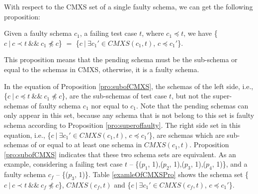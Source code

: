 With respect to the CMXS set of a single faulty schema, we can get the following proposition:


\begin{proposition}\label{pro:subofCMXS}
Given a faulty schema $c_{1}$, a failing test case $t$, where $c_{1} \preceq t$, we have \{$c\ |\ c \prec t\ \&\&\ c_{1} \npreceq c$\} $=$  \{$ c\ |\ \exists c_{1}' \in CMXS(c_{1}, t)$, $c \preceq c_{1}'$\}.
\end{proposition}

This proposition means that the pending schema must be the sub-schema or equal to the schemas in CMXS, otherwise, it is a faulty schema.

In the equation of Proposition \ref{pro:subofCMXS}, the schemas of the left side, i.e., \{$c\ |\ c \preceq t\ \&\&\ c_{1} \npreceq c$\}, are the sub-schemas of test case $t$, but not the super-schemas of faulty schema $c_{1}$ nor equal to $c_{1}$.  Note that the pending schemas can only appear in this set, because any schema that is not belong to this set is faulty schema according to Proposition \ref{pro:superoffaulty}. The right side set in this equation, i.e., \{$ c\ |\ \exists c_{1}' \in CMXS(c_{1}, t)$, $c \preceq c_{1}'$\}, are schemas which are sub-schemas of or equal to at least one schema in $CMXS(c_{1}, t)$. Proposition \ref{pro:subofCMXS} indicates that these two schema sets are equivalent. As an example, considering a failing test case $t$ -- \{($p_{1}$, 1),($p_{2}$, 1),($p_{3}$, 1),($p_{4}$, 1)\}, and a faulty schema $c_{f}$ --  \{($p_{3}$, 1)\}. Table \ref{examleOfCMXSPro} shows the schema set  \{$c\ |\ c \prec t\ \&\&\ c_{f} \npreceq c$\}, $CMXS(c_{f}, t)$ and \{$ c\ |\ \exists c_{1}' \in CMXS(c_{f}, t)$, $c \preceq c_{1}'$\}.

